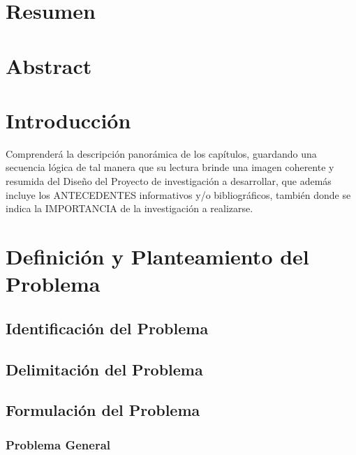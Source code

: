 \documentclass[
  spanish,
  11pt,
  letterpaper,
  letterpaper,
  12pt]{book}
\begin{document}
\chapter{Resumen}\label{resumen}

\chapter{Abstract}\label{abstract}

\tableofcontents
\listoftables
\listoffigures

\mainmatter

\chapter{Introducción}\label{introducciuxf3n}

Comprenderá la descripción panorámica de los capítulos, guardando una
secuencia lógica de tal manera que su lectura brinde una imagen
coherente y resumida del Diseño del Proyecto de investigación a
desarrollar, que además incluye los ANTECEDENTES informativos y/o
bibliográficos, también donde se indica la IMPORTANCIA de la
investigación a realizarse.

\chapter{Definición y Planteamiento del
Problema}\label{definiciuxf3n-y-planteamiento-del-problema}

\section{Identificación del
Problema}\label{identificaciuxf3n-del-problema}

\section{Delimitación del Problema}\label{delimitaciuxf3n-del-problema}

\section{Formulación del Problema}\label{formulaciuxf3n-del-problema}

\subsection{Problema General}\label{problema-general}
\end{document}
